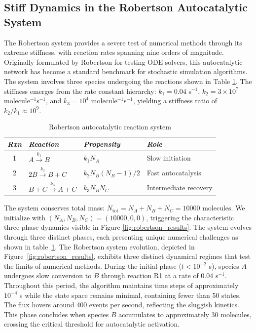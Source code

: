 \documentclass[review,onefignum,onetabnum]{siamart171218}
\begin{document}
\subsection{Stiff Dynamics in the Robertson Autocatalytic System}

The Robertson system provides a severe test of numerical methods through its extreme stiffness, with reaction rates spanning nine orders of magnitude. Originally formulated by Robertson \cite{Robertson1967} for testing ODE solvers, this autocatalytic network has become a standard benchmark for stochastic simulation algorithms. The system involves three species undergoing the reactions shown in Table \ref{table:robertson}. The stiffness emerges from the rate constant hierarchy: $k_1 = 0.04$ s$^{-1}$, $k_2 = 3 \times 10^7$ molecule$^{-1}$s$^{-1}$, and $k_3 = 10^4$ molecule$^{-1}$s$^{-1}$, yielding a stiffness ratio of $k_2/k_1 \approx 10^9$.

\begin{table}[!htbp]
\centering
\caption{Robertson autocatalytic reaction system}
\label{table:robertson}
\begin{tabular}{|c|l|l|l|}
\hline
\textit{Rxn} & \textit{Reaction} & \textit{Propensity} & \textit{Role} \\
\hline
1 & $A \xrightarrow{k_1} B$ & $k_1 N_A$ & Slow initiation \\
2 & $2B \xrightarrow{k_2} B + C$ & $k_2 N_B(N_B-1)/2$ & Fast autocatalysis \\
3 & $B + C \xrightarrow{k_3} A + C$ & $k_3 N_B N_C$ & Intermediate recovery \\
\hline
\end{tabular}
\end{table}

The system conserves total mass: $N_{\text{tot}} = N_A + N_B + N_C = 10000$ molecules. We initialize with $(N_A, N_B, N_C) = (10000, 0, 0)$, triggering the characteristic three-phase dynamics visible in Figure \ref{fig:robertson_results}. The system evolves through three distinct phases, each presenting unique numerical challenges as shown in table~\ref{table:robertson}. The Robertson system evolution, depicted in Figure~\ref{fig:robertson_results}, exhibits three distinct dynamical regimes that test the limits of numerical methods. During the initial phase ($t < 10^{-2}$ s), species $A$ undergoes slow conversion to $B$ through reaction R1 at a rate of $0.04$ s$^{-1}$. Throughout this period, the algorithm maintains time steps of approximately $10^{-4}$ s while the state space remains minimal, containing fewer than 50 states. The flux hovers around 400 events per second, reflecting the sluggish kinetics. This phase concludes when species $B$ accumulates to approximately 30 molecules, crossing the critical threshold for autocatalytic activation.
\end{document}

